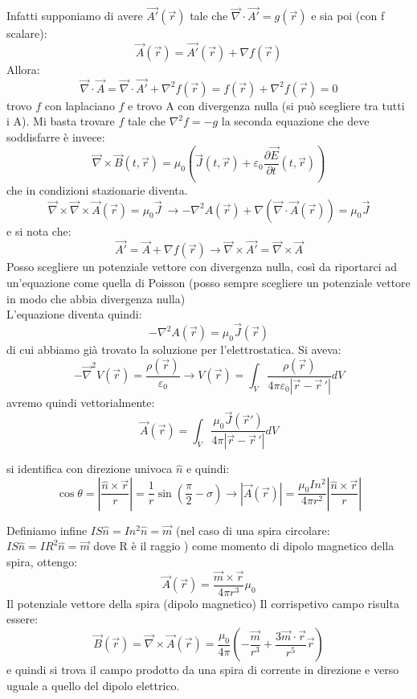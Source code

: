 \documentclass{book}
\begin{document}
Infatti supponiamo di avere $\vec{A'}(\vec{r})$ tale che $\vec{\nabla}\cdot\vec{A'}=g(\vec{r})$
 e sia poi (con f  scalare):
 $$
 \vec{A}(\vec{r})=\vec{A'}(\vec{r})+ \nabla f(\vec{r})
 $$
Allora:
$$
\vec{\nabla}\cdot \vec{A} = \vec{\nabla}\cdot \vec{A'}+ \nabla^2f(\vec{r})= f(\vec{r})+\nabla^2f(\vec{r}) = 0
$$
 trovo $f$ con laplaciano $f$ e trovo A con divergenza nulla (si può scegliere tra tutti i A). Mi basta trovare $f$ tale che $\nabla^2f=-g$
la seconda equazione che deve soddisfarre è invece:
$$
\vec{\nabla}\times\vec{B}(t,\vec{r})= \mu_0(\vec{J}(t,\vec{r})+\varepsilon_0\frac{\partial \vec{E}}{\partial t}(t,\vec{r}))
$$
che in condizioni stazionarie diventa.
$$
\vec{\nabla}\times\vec{\nabla}\times\vec{A}(\vec{r})=\mu_0\vec{J}\ \to - \nabla^2 A(\vec{r})+ \nabla(\vec{\nabla}\cdot\vec{A}(\vec{r}))=\mu_0 \vec{J}
$$
 e si nota che: 
 $$
 \vec{A'}=\vec{A}+\nabla f(\vec{r}) \to \vec{\nabla} \times\vec{A'} = \vec{\nabla} \times\vec{A}
 $$
Posso scegliere un potenziale vettore con divergenza nulla, così da riportarci ad un'equazione come quella di Poisson (posso sempre scegliere un potenziale vettore in modo che abbia divergenza nulla)
\\
L'equazione diventa quindi:
$$
-\nabla^2 A (\vec{r})= \mu_0\vec{J}(\vec{r})
$$
di cui abbiamo già trovato la soluzione per l'elettrostatica. 
Si aveva: 
$$
-\vec{\nabla}^2V(\vec{r}) = \frac{\rho(\vec{r})}{\varepsilon_0}
 \to V(\vec{r})= \int_V \frac{\rho(\vec{r})}{4\pi\varepsilon_0|\vec{r}-\vec{r}\,'|}dV$$
 avremo quindi vettorialmente:
$$
\vec{A}(\vec{r})= \int_V  \frac{\mu_0 \vec{J}(\vec{r}')}{4\pi |\vec{r}-\vec{r}\,'|} dV
 $$

 si identifica con direzione univoca $\hat{n}$ e quindi: 
 $$
 \cos\theta= |\frac{\hat{n}\times\vec{r}}{r}|= \frac{1}{r}\sin(\frac{\pi}{2}-\sigma) \to |\vec{A}(\vec{r})|= \frac{\mu_0In^2}{4\pi r^2} |\frac{\hat{n}\times\vec{r}}{r}|
 $$

 Definiamo infine $IS \hat{n}= In^2\hat{n}= \vec{m}$ (nel caso di una spira circolare: $IS \hat{n}= IR^2\hat{n}= \vec{m}$ dove R è il raggio ) come momento di dipolo magnetico della spira, ottengo:
$$
\vec{A}(\vec{r})= \frac{\vec{m}\times\vec{r}}{4\pi r^3}\mu_0
$$
Il potenziale vettore della spira (dipolo magnetico)
Il corrispetivo campo risulta essere:
$$
\vec{B}(\vec{r})= \vec{\nabla}\times\vec{A}(\vec{r}) = \frac{\mu_0}{4\pi}\left( -\frac{\vec{m}}{r^3} + \frac{3\vec{m}\cdot \vec{r}}{r^5}\vec{r}
 \right)$$
e quindi si trova il campo prodotto da una spira di corrente in direzione e verso uguale a quello del dipolo elettrico.
\end{document}
